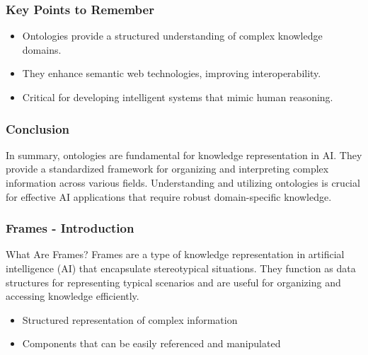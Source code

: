 \documentclass[aspectratio=169]{beamer}
\begin{document}
\begin{frame}[fragile]
    \frametitle{Key Points to Remember}
    \begin{itemize}
        \item Ontologies provide a structured understanding of complex knowledge domains.
        \item They enhance semantic web technologies, improving interoperability.
        \item Critical for developing intelligent systems that mimic human reasoning.
    \end{itemize}
\end{frame}

\begin{frame}[fragile]
    \frametitle{Conclusion}
    In summary, ontologies are fundamental for knowledge representation in AI. They provide a standardized framework for organizing and interpreting complex information across various fields. Understanding and utilizing ontologies is crucial for effective AI applications that require robust domain-specific knowledge.
\end{frame}

\begin{frame}[fragile]
    \frametitle{Frames - Introduction}
    \begin{block}{What Are Frames?}
        Frames are a type of knowledge representation in artificial intelligence (AI) that encapsulate stereotypical situations. They function as data structures for representing typical scenarios and are useful for organizing and accessing knowledge efficiently.
    \end{block}
    \begin{itemize}
        \item Structured representation of complex information
        \item Components that can be easily referenced and manipulated
    \end{itemize}
\end{frame}
\end{document}
